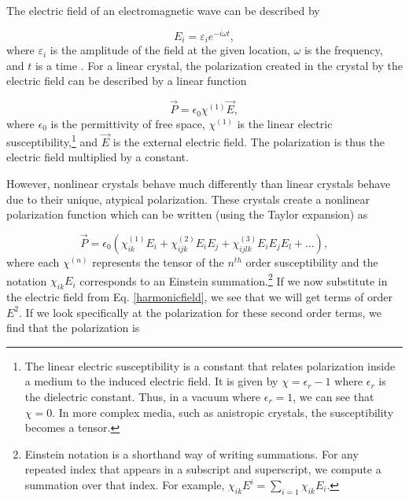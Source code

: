 The electric field of an electromagnetic wave can be described by

\begin{equation}
  E_i = \varepsilon _i e^{-i\omega t},
  \label{harmonicfield}
\end{equation}
%
where $\varepsilon_i$ is the amplitude of the field at the given location, $\omega$ is the frequency, and $t$ is a time \cite{Dood2006}. For a linear crystal, the polarization created in the crystal by the electric field can be described by a linear function

\begin{equation}
  \vec P = \epsilon _0 \chi^{(1)} \vec E,
  \label{linearpolarization}
\end{equation}
%
where $\epsilon_0$ is the permittivity of free space, $\chi^{(1)}$ is the linear electric susceptibility,\footnote{The linear electric susceptibility is a constant that relates polarization inside a medium to the induced electric field. It is given by $\chi = \epsilon_r - 1$ where $\epsilon_r$ is the dielectric constant. Thus, in a vacuum where $\epsilon_r = 1$, we can see that $\chi = 0$. In more complex media, such as anistropic crystals, the susceptibility becomes a tensor.} and $\vec E$ is the external electric field. The polarization is thus the electric field multiplied by a constant.

However, nonlinear crystals behave much differently than linear crystals behave due to their unique, atypical polarization. These crystals create a nonlinear polarization function which can be written (using the Taylor expansion) as

\begin{equation}
  \vec P = \epsilon _0 \left( \chi^{(1)}_{ik}E_i + \chi^{(2)}_{ijk} E_i E_j + \chi^{(3)}_{ijlk}E_i E_j E_l +\dots \right),
  \label{nonlinearpolarization}
\end{equation}
%
where each $\chi^{(n)}$ represents the tensor of the $n^{th}$ order susceptibility and the notation $\chi_{ik} E_i$ corresponds to an Einstein summation.\footnote{Einstein notation is a shorthand way of writing summations. For any repeated index that appears in a subscript and superscript, we compute a summation over that index. For example, $\chi _{ik}E^i = \sum_{i=1} \chi_{ik}E_i$.} If we now substitute in the electric field from Eq. \ref{harmonicfield}, we see that we will get terms of order $E^2$. If we look specifically at the polarization for these second order terms, we find that the polarization is

